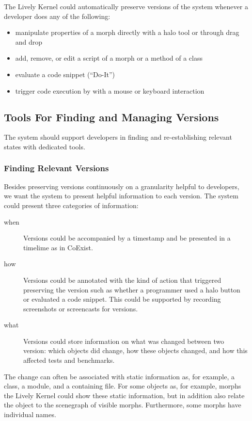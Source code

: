 The Lively Kernel could automatically preserve versions of the system whenever a developer does any of the following:
\begin{itemize}
    \item manipulate properties of a morph directly with a halo tool or through drag and drop
    \item add, remove, or edit a script of a morph or a method of a class
    \item evaluate a code snippet (``Do-It'')
    \item trigger code execution by with a mouse or keyboard interaction
\end{itemize}

\subsection{Tools For Finding and Managing Versions}

The system should support developers in finding and re-establishing relevant states with dedicated tools.

\subsubsection{Finding Relevant Versions}

Besides preserving versions continuously on a granularity helpful to developers, we want the system to present helpful information to each version.
The system could present three categories of information:

\begin{description}
    \item[when] Versions could be accompanied by a timestamp and be presented in a timelime as in CoExist.
    \item[how] Versions could be annotated with the kind of action that triggered preserving the version such as whether a programmer used a halo button or evaluated a code snippet. This could be supported by recording screenshots or screencasts for versions.
    \item[what] Versions could store information on what was changed between two version: which objects did change, how these objects changed, and how this affected tests and benchmarks.
\end{description}

The change can often be associated with static information as, for example, a class, a module, and a containing file.
For some objects as, for example, morphs the Lively Kernel could show these static information, but in addition also relate the object to the scenegraph of visible morphs.
Furthermore, some morphs have individual names.

